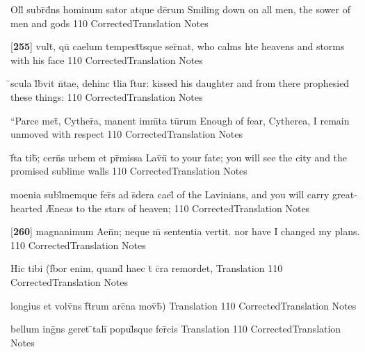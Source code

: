 \documentclass[]{book}
\begin{document}
\latline
  {Oll\={\macron {\i}} subr\={\macron {\i}}d\={}ns hominum sator atque de\={}rum}
  { Smiling down on all men, the sower of men and gods }
  {110}
  { CorrectedTranslation }
  { Notes }


\latline
  {[\textbf{255}] vult\={}, qu\={} caelum tempest\={}t\={}sque ser\={}nat,}
  { who calms hte heavens and storms with his face }
  {110}
  { CorrectedTranslation }
  { Notes }


\latline
  {\={}scula l\={\macron {\i}}b\={}vit n\={}tae, dehinc t\={}lia f\={}tur:}
  { kissed his daughter and from there prophesied these things: }
  {110}
  { CorrectedTranslation }
  { Notes }


\latline
  {``Parce met\={}, Cyther\={}a, manent imm\={}ta tu\={}rum}
  { Enough of fear, Cytherea, I remain unmoved with respect }
  {110}
  { CorrectedTranslation }
  { Notes }


\latline
  {f\={}ta tib\={\macron {\i}}; cern\={}s urbem et pr\={}missa Lav\={\macron {\i}}n\={\macron {\i}}}
  { to your fate; you will see the city and the promised sublime walls }
  {110}
  { CorrectedTranslation }
  { Notes }


\latline
  {moenia subl\={\macron {\i}}memque fer\={}s ad s\={\macron {\i}}dera cael\={\macron {\i}}}
  { of the Lavinians, and you will carry great-hearted {\AE}neas to the stars of heaven;  }
  {110}
  { CorrectedTranslation }
  { Notes }


\latline
  {[\textbf{260}] magnanimum Aen\={}\={}n; neque m\={} sententia vertit.}
  { nor have I changed my plans. }
  {110}
  { CorrectedTranslation }
  { Notes }


\latline
  {Hic tibi (f\={}bor enim, quand\={} haec t\={} c\={}ra remordet,}
  { Translation }
  {110}
  { CorrectedTranslation }
  { Notes }


\latline
  {longius et volv\={}ns f\={}t\={}rum arc\={}na mov\={}b\={})}
  { Translation }
  {110}
  { CorrectedTranslation }
  { Notes }


\latline
  {bellum ing\={}ns geret \={}tali\={} popul\={}sque fer\={}cis}
  { Translation }
  {110}
  { CorrectedTranslation }
  { Notes }
\end{document}

